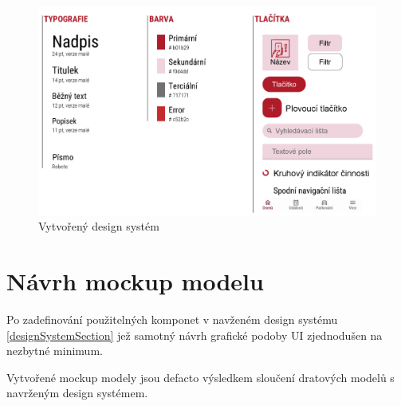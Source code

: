 \begin{figure}[H]
  \centering
  \includegraphics[width=.99\textwidth]{design_system.jpg}
  \caption{Vytvořený design systém}
  \label{fig:design_system}
\end{figure}

\section{Návrh mockup modelu} \label{navrhMockupModelu}
Po zadefinování použitelných komponet v navženém design systému \ref{designSystemSection} jež samotný návrh grafické podoby UI zjednodušen 
na nezbytné minimum. 

Vytvořené mockup modely jsou defacto výsledkem sloučení dratových modelů s navrženým design systémem.

